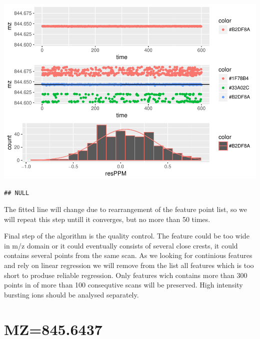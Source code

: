 \documentclass[]{article}
\newenvironment{Shaded}{\begin{snugshade}}{\end{snugshade}}
\newcommand{\KeywordTok}[1]{\textcolor[rgb]{0.13,0.29,0.53}{\textbf{#1}}}
\newcommand{\FloatTok}[1]{\textcolor[rgb]{0.00,0.00,0.81}{#1}}
\newcommand{\OperatorTok}[1]{\textcolor[rgb]{0.81,0.36,0.00}{\textbf{#1}}}
\newcommand{\NormalTok}[1]{#1}
\begin{document}
\includegraphics{Supplementary_document_files/figure-latex/filter.lm-1.pdf}

\begin{verbatim}
## NULL
\end{verbatim}

The fitted line will change due to rearrangement of the feature point
list, so we will repeat this step untill it converges, but no more than
50 times.

Final step of the algorithm is the quality control. The feature could be
too wide in m/z domain or it could eventually consists of several close
crests, it could contains several points from the same scan. As we
looking for continious features and rely on linear regression we will
remove from the list all features which is too short to produse reliable
regression. Only features wich contains more than 300 points in of more
than 100 consequtive scans will be preserved. High intensity bursting
ions should be analysed separately.

\section{MZ=845.6437}\label{mz845.6437}

\begin{Shaded}
\end{Shaded}
\end{document}
